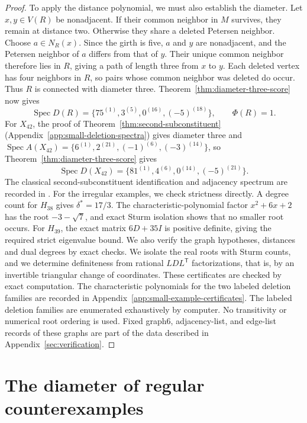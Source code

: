 \documentclass[a4paper,10pt,reqno]{amsart}
\theoremstyle{plain}
\theoremstyle{definition}
\theoremstyle{remark}
\newcommand{\Spec}{\operatorname{Spec}}
\begin{document}
\begin{proof}
To apply the distance polynomial, we must also establish the diameter.
Let \(x,y\in V(R)\) be nonadjacent. If their common neighbor in \(M\)
survives, they remain at distance two. Otherwise they share a deleted
Petersen neighbor. Choose \(a\in N_R(x)\). Since the girth is five, \(a\)
and \(y\) are nonadjacent, and the Petersen neighbor of \(a\) differs from
that of \(y\). Their unique common neighbor therefore lies in \(R\), giving a
path of length three from \(x\) to \(y\).
Each deleted vertex has four neighbors in \(R\), so pairs whose common
neighbor was deleted do occur. Thus \(R\) is connected with diameter three.
Theorem~\ref{thm:diameter-three-score} now gives
\[
 \Spec D(R)=\{75^{(1)},3^{(5)},0^{(16)},(-5)^{(18)}\},
 \qquad \Phi(R)=1.
\]
For \(X_{42}\), the proof of Theorem~\ref{thm:second-subconstituent}
(Appendix~\ref{app:small-deletion-spectra}) gives diameter three and
\(\Spec A(X_{42})=\{6^{(1)},2^{(21)},(-1)^{(6)},(-3)^{(14)}\}\), so
Theorem~\ref{thm:diameter-three-score} gives
\[
 \Spec D(X_{42})=\{81^{(1)},4^{(6)},0^{(14)},(-5)^{(21)}\}.
\]
The classical second-subconstituent identification and adjacency spectrum are
recorded in \cite[Table~3, p.~265]{vanDamHaemers2003}.
For the irregular examples, we check strictness directly. A degree count
for \(H_{38}\) gives \(\delta^*=17/3\). The characteristic-polynomial factor
\(x^2+6x+2\) has the root \(-3-\sqrt7\), and exact Sturm isolation shows
that no smaller root occurs. For \(H_{39}\), the exact matrix \(6D+35I\)
is positive definite, giving the required strict eigenvalue bound.  We also verify the graph hypotheses, distances and dual degrees by exact checks.
We isolate the real roots with Sturm counts, and we determine definiteness
from rational \(LDL^{\mathsf T}\) factorizations, that is, by an invertible
triangular change of coordinates. These certificates are checked by exact
computation.  The characteristic polynomials for the two labeled deletion families are
recorded in Appendix~\ref{app:small-example-certificates}.
The labeled deletion families are enumerated exhaustively by computer.
No transitivity or numerical root ordering is used.  Fixed graph6,
adjacency-list, and edge-list records of these graphs are part of the data
described in Appendix~\ref{sec:verification}.
\end{proof}

\section{The diameter of regular counterexamples}\label{sec:obstructions}
\end{document}
